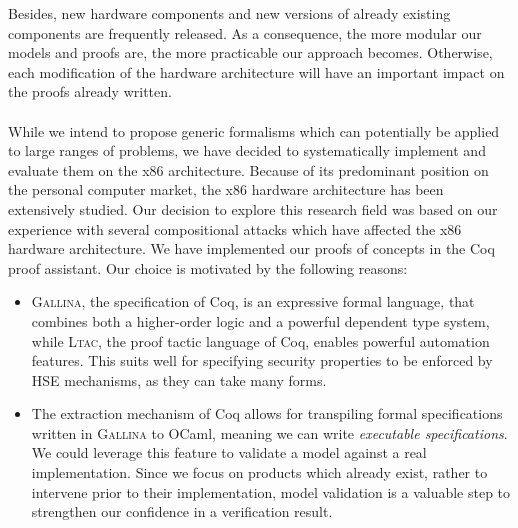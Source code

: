 Besides, new hardware components and new versions of already existing components
are frequently released.
%
As a consequence, the more modular our models and proofs are, the more
practicable our approach becomes.
%
Otherwise, each modification of the hardware architecture will have an important
impact on the proofs already written.

\paragraph{}
%
While we intend to propose generic formalisms which can potentially be applied
to large ranges of problems, we have decided to systematically implement and
evaluate them on the x86 architecture.
%
Because of its predominant position on the personal computer market, the x86
hardware architecture has been extensively studied.
%
Our decision to explore this research field was based on our experience with
several compositional attacks which have affected the x86 hardware architecture.
%
We have implemented our proofs of concepts in the Coq proof assistant.
%
Our choice is motivated by the following reasons:
%
\begin{itemize}
\item {\scshape Gallina}, the specification of Coq, is an expressive formal
  language, that combines both a higher-order logic and a powerful dependent
  type system, while {\scshape Ltac}, the proof tactic language of Coq, enables
  powerful automation features.
  This suits well for specifying security properties to be enforced by HSE
  mechanisms, as they can take many forms.
\item The extraction mechanism of Coq allows for transpiling formal
  specifications written in {\scshape Gallina} to OCaml, meaning we can write
  \emph{executable specifications}.
  We could leverage this feature to validate a model against a real
  implementation. 
  Since we focus on products which already exist, rather to intervene prior to
  their implementation, model validation is a valuable step to strengthen our
  confidence in a verification result. 
\end{itemize}

